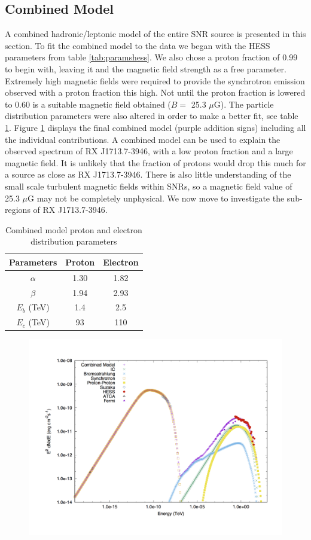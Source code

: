 \documentclass[12pt,a4paper]{article}
\begin{document}
\subsection{Combined Model}
A combined hadronic/leptonic model of the entire SNR source is presented in this section. To fit the combined model to the data we began with the HESS parameters from table \ref{tab:paramshess}. We also chose a proton fraction of 0.99 to begin with, leaving it and the magnetic field strength as a free parameter. Extremely high magnetic fields were required to provide the synchrotron emission observed with a proton fraction this high. Not until the proton fraction is lowered to 0.60 is a suitable magnetic field obtained ($B =$ 25.3 $\mu$G). The particle distribution parameters were also altered in order to make a better fit, see table \ref{tab:paramscomb}. Figure \ref{fig:rxj1713comb} displays the final combined model (purple addition signs) including all the individual contributions. A combined model can be used to explain the observed spectrum of RX J1713.7-3946, with a low proton fraction and a large magnetic field. It is unlikely that the fraction of protons would drop this much for a source as close as RX J1713.7-3946. There is also little understanding of the small scale turbulent magnetic fields within SNRs, so a magnetic field value of 25.3 $\mu$G may not be completely unphysical. We now move to investigate the sub-regions of RX J1713.7-3946.
 \begin{table}[H] 
 	\begin{center}
 		\begin{tabular}{ccc}
 			\toprule
 			Parameters & Proton & Electron \\ 
 			\hline 
 			$\alpha$& 1.30 & 1.82 \\ 
 			$\beta$& 1.94 & 2.93 \\ 
 			$E_{b}$ (TeV)& 1.4 & 2.5 \\ 
 			$E_{c}$ (TeV)& 93 & 110 \\ 
 			\bottomrule
 		\end{tabular} 
 	\end{center}
 	\caption{Combined model proton and electron distribution parameters}
 	\label{tab:paramscomb}
 \end{table}
\begin{figure}[H]
	\centering
	\includegraphics[width=0.45\linewidth, height=0.35\textheight, angle=-90]{rxj1713_comb}
	\caption{}
	\label{fig:rxj1713comb}
\end{figure}
\end{document}
